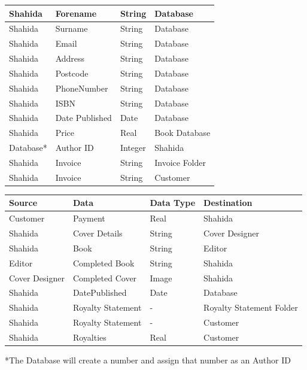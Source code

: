 \begin{center}
\begin{tabular}{|p{3cm}|p{3cm}|p{2cm}|p{2cm}|}
    Shahida & Forename & String & Database  \\ \hline
    Shahida & Surname & String & Database  \\ \hline
    Shahida & Email & String & Database  \\ \hline
    Shahida & Address & String & Database  \\ \hline
    Shahida & Postcode & String & Database  \\ \hline
    Shahida & PhoneNumber & String & Database  \\ \hline
    Shahida & ISBN & String & Database \\ \hline
    Shahida & Date Published & Date & Database \\ \hline
    Shahida & Price & Real & Book Database \\ \hline
    Database* & Author ID & Integer & Shahida  \\ \hline
    Shahida & Invoice & String & Invoice Folder \\ \hline 
    Shahida & Invoice & String & Customer  \\ \hline
\end{tabular}
\end{center}
\begin{center}
\begin{tabular}{|p{3cm}|p{3cm}|p{2cm}|p{2cm}|}
    \hline
    \textbf{Source} & \textbf{Data} & \textbf{Data Type} & \textbf{Destination} \\ \hline
    Customer & Payment & Real & Shahida  \\ \hline
    Shahida & Cover Details & String & Cover Designer\\ \hline
    Shahida & Book & String & Editor  \\ \hline
    Editor & Completed Book & String & Shahida  \\ \hline
    Cover Designer & Completed Cover & Image & Shahida \\ \hline
    Shahida & DatePublished & Date & Database \\ \hline 
    Shahida & Royalty Statement & - & Royalty Statement Folder \\ \hline
    Shahida & Royalty Statement & - & Customer \\ \hline
    Shahida & Royalties & Real & Customer \\ \hline 
	
    \hline
\end{tabular}
\end{center}
*The Database will create a number and assign that number as an Author ID

